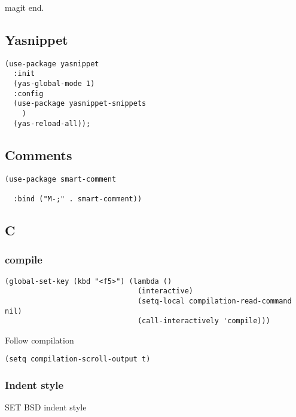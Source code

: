 \documentclass[12pt]{article}
\begin{document}
magit end.

\subsection{Yasnippet}
\label{sec:orgd6cfc34}

\begin{verbatim}
(use-package yasnippet
  :init
  (yas-global-mode 1)
  :config
  (use-package yasnippet-snippets
    )
  (yas-reload-all));
\end{verbatim}

\subsection{Comments}
\label{sec:orgd6c7912}
\begin{verbatim}
(use-package smart-comment

  :bind ("M-;" . smart-comment))
\end{verbatim}

\subsection{C}
\label{sec:orgba52812}
\subsubsection{compile}
\label{sec:orgbf237de}

\begin{verbatim}
(global-set-key (kbd "<f5>") (lambda ()
                               (interactive)
                               (setq-local compilation-read-command nil)
                               (call-interactively 'compile)))

\end{verbatim}

Follow compilation

\begin{verbatim}
(setq compilation-scroll-output t)
\end{verbatim}


\subsubsection{Indent style}
\label{sec:org45419b6}

SET BSD indent style
\end{document}
